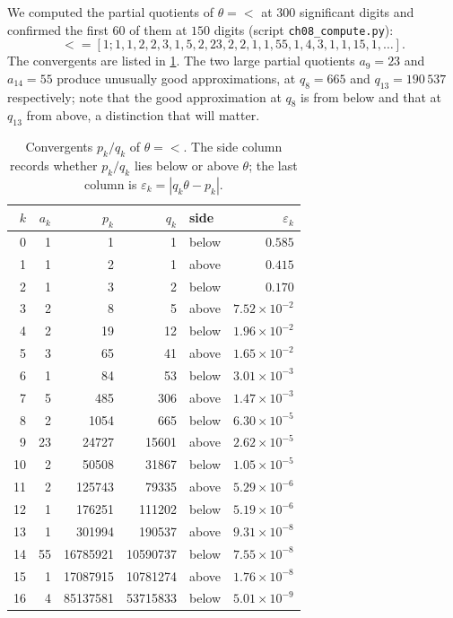 We computed the partial quotients of $\theta=\lt$ at $300$ significant digits
and confirmed the first $60$ of them at $150$ digits (script
\texttt{ch08\_compute.py}):
\[
  \lt=[1;1,1,2,2,3,1,5,2,23,2,2,1,1,55,1,4,3,1,1,15,1,\dots].
\]
The convergents are listed in \cref{tab:ch8:conv}. The two large partial
quotients $a_9=23$ and $a_{14}=55$ produce unusually good approximations, at
$q_8=665$ and $q_{13}=190\,537$ respectively; note that the good approximation
at $q_8$ is from below and that at $q_{13}$ from above, a distinction that
will matter.

\begin{table}[ht]
\centering
\caption{Convergents $p_k/q_k$ of $\theta=\lt$. The side column records
whether $p_k/q_k$ lies below or above $\theta$; the last column is
$\varepsilon_k=|q_k\theta-p_k|$.}
\label{tab:ch8:conv}
\small
\begin{tabular}{@{}rrrrlr@{}}
\toprule
$k$ & $a_k$ & $p_k$ & $q_k$ & side & $\varepsilon_k$ \\
\midrule
 0 & 1 & 1 & 1 & below & $0.585$ \\
 1 & 1 & 2 & 1 & above & $0.415$ \\
 2 & 1 & 3 & 2 & below & $0.170$ \\
 3 & 2 & 8 & 5 & above & $7.52\times10^{-2}$ \\
 4 & 2 & 19 & 12 & below & $1.96\times10^{-2}$ \\
 5 & 3 & 65 & 41 & above & $1.65\times10^{-2}$ \\
 6 & 1 & 84 & 53 & below & $3.01\times10^{-3}$ \\
 7 & 5 & 485 & 306 & above & $1.47\times10^{-3}$ \\
 8 & 2 & 1054 & 665 & below & $6.30\times10^{-5}$ \\
 9 & 23 & 24727 & 15601 & above & $2.62\times10^{-5}$ \\
10 & 2 & 50508 & 31867 & below & $1.05\times10^{-5}$ \\
11 & 2 & 125743 & 79335 & above & $5.29\times10^{-6}$ \\
12 & 1 & 176251 & 111202 & below & $5.19\times10^{-6}$ \\
13 & 1 & 301994 & 190537 & above & $9.31\times10^{-8}$ \\
14 & 55 & 16785921 & 10590737 & below & $7.55\times10^{-8}$ \\
15 & 1 & 17087915 & 10781274 & above & $1.76\times10^{-8}$ \\
16 & 4 & 85137581 & 53715833 & below & $5.01\times10^{-9}$ \\

\end{tabular}
\end{table}
